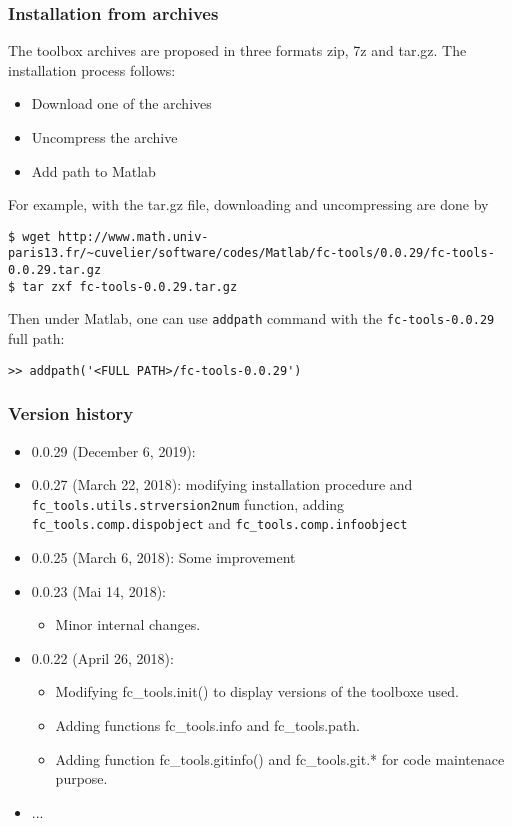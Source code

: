
\subsubsection{Installation from archives}
The toolbox archives are proposed in three formats zip, 7z and tar.gz. The installation process follows:
\begin{itemize}
\item Download one of the archives
\item Uncompress the archive
\item Add path to Matlab
\end{itemize}

For example, with the tar.gz file, downloading and uncompressing are done by 
\begin{verbatim}
$ wget http://www.math.univ-paris13.fr/~cuvelier/software/codes/Matlab/fc-tools/0.0.29/fc-tools-0.0.29.tar.gz
$ tar zxf fc-tools-0.0.29.tar.gz
\end{verbatim}
Then under Matlab, one can use \texttt{addpath} command with the \texttt{fc-tools-0.0.29} full path:
\begin{verbatim}
>> addpath('<FULL PATH>/fc-tools-0.0.29')
\end{verbatim}

\subsubsection{Version history}

\begin{itemize}
\item 0.0.29 (December 6, 2019):  
\item 0.0.27 (March 22, 2018): modifying installation procedure and \verb+fc_tools.utils.strversion2num+ function, adding \verb+fc_tools.comp.dispobject+
and \verb+fc_tools.comp.infoobject+
\item 0.0.25 (March 6, 2018): Some improvement
\item 0.0.23 (Mai 14, 2018):
\begin{itemize}
\item Minor internal changes.
\end{itemize}
\item 0.0.22 (April 26, 2018): 
\begin{itemize}
\item Modifying fc_tools.init() to display versions of the toolboxe used.
\item Adding functions fc_tools.info and fc_tools.path.
\item Adding function fc_tools.gitinfo() and fc_tools.git.* for code maintenace purpose.
\end{itemize}
\item ...
\end{itemize}
 

